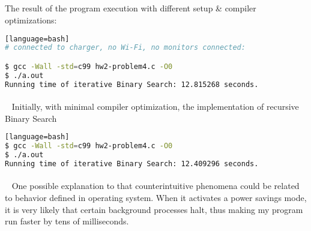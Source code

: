 \documentclass{article}
\begin{document}
\paragraph{}\
\paragraph{}\




\noindent The result of the program execution with different setup \& compiler optimizations:



	
	\ttfamily
	\begin{lstlisting}[basicstyle=\small, language=bash][language=bash]
# connected to charger, no Wi-Fi, no monitors connected:

$ gcc -Wall -std=c99 hw2-problem4.c -O0
$ ./a.out
Running time of iterative Binary Search: 12.815268 seconds.
	\end{lstlisting}

\paragraph{}\
	\rmfamily
	Initially, with minimal compiler optimization, the implementation of recursive Binary Search

	\ttfamily
	\begin{lstlisting}[basicstyle=\small, language=bash][language=bash]	
$ gcc -Wall -std=c99 hw2-problem4.c -O0
$ ./a.out
Running time of iterative Binary Search: 12.409296 seconds.
	\end{lstlisting}
	
	\paragraph{}\
	\rmfamily
	One possible explanation to that counterintuitive phenomena could be related to behavior defined in operating system. When it activates a power savings mode, it is very likely that certain background processes halt, thus making my program run faster by tens of milliseconds.

\paragraph{}\
\paragraph{}\
\paragraph{}\
\end{document}

